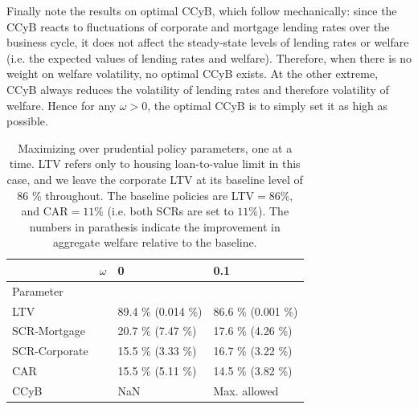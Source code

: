 \documentclass[12pt]{article}
\numberwithin{equation}{section}
\begin{document}
Finally note the results on optimal CCyB, which follow mechanically: since the CCyB reacts to fluctuations of corporate and mortgage lending rates over the business cycle, it does not affect the steady-state levels of lending rates or welfare (i.e. the expected values of lending rates and welfare). Therefore, when there is no weight on welfare volatility, no optimal CCyB exists. At the other extreme, CCyB always reduces the volatility of lending rates and therefore volatility of welfare. Hence for any $\omega>0$, the optimal CCyB is to simply set it as high as possible. 

\begin{table}[h]

\caption{Maximizing over prudential policy parameters, one at a time. LTV refers only to housing loan-to-value limit in this case, and we leave the corporate LTV at its baseline level of 86 \% throughout. The baseline policies are LTV$=86\%$, and CAR$=11 \% $ (i.e. both SCRs are set to $11 \%$). The numbers in parathesis indicate the improvement in aggregate welfare relative to the baseline.}
\label{optimalPrud_1}
\begin{tabular}{l|l|l|l}

 & $\omega$ & 0 & 0.1   \\
 \hline
 \hline
Parameter & & &  \\
\hline
\hline
LTV &  & 89.4 \% (0.014 \%) & 86.6 \% (0.001 \%)  \\

SCR-Mortgage &  & 20.7 \% (7.47 \%) & 17.6 \% (4.26 \%) \\

SCR-Corporate & & 15.5 \% (3.33 \%) & 16.7 \% (3.22 \%) \\

CAR & & 15.5 \% (5.11 \%) & 14.5 \% (3.82 \%) \\

CCyB & & NaN & Max. allowed \\

\end{tabular}
\end{table}
\end{document}
